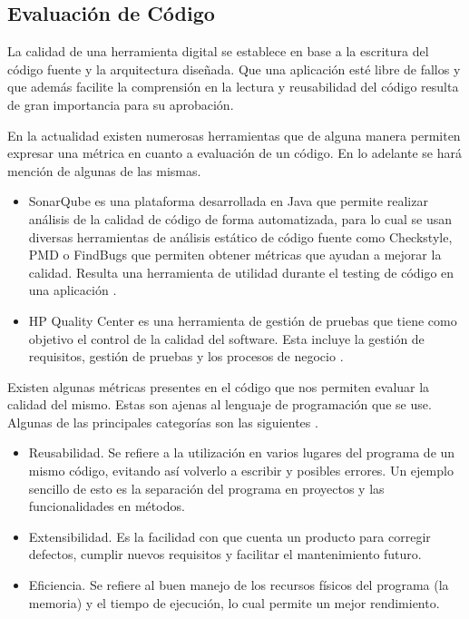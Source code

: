 \documentclass[a4paper,openright,11pt,oneside]{book}
\begin{document}
	\subsection{Evaluación de Código}
	
	La calidad de una herramienta digital se establece en base a la escritura del código fuente y la arquitectura diseñada. Que una aplicación esté libre de fallos y que además facilite la comprensión en la lectura y reusabilidad del código resulta de gran importancia para su aprobación.
	
	En la actualidad existen numerosas herramientas que de alguna manera permiten expresar una métrica en cuanto a evaluación de un código. En lo adelante se hará mención de algunas de las mismas.
	
	\begin{itemize}
		\item SonarQube es una plataforma desarrollada en Java que permite realizar análisis de la calidad de código de forma automatizada, para lo cual se usan diversas herramientas de análisis estático de código fuente como Checkstyle, PMD o FindBugs que permiten obtener métricas que ayudan a mejorar la calidad. Resulta una herramienta de utilidad durante el testing de código en una aplicación \cite{SonarQube}.
		
		\item HP Quality Center es una herramienta de gestión de pruebas que tiene como objetivo el control de la calidad del software. Esta incluye la gestión de requisitos, gestión de pruebas y los procesos de negocio \cite{HPQualityCenter}.
	\end{itemize}
	
	Existen algunas métricas presentes en el código que nos permiten evaluar la calidad del mismo. Estas son ajenas al lenguaje de programación que se use. Algunas de las principales categorías son las siguientes \cite{callejas2017modelos}.
	
	\begin{itemize}
		\item Reusabilidad. Se refiere a la utilización en varios lugares del programa de un mismo código, evitando así volverlo a escribir y posibles errores. Un ejemplo sencillo de esto es la separación del programa en proyectos y las funcionalidades en métodos.
		
		\item Extensibilidad. Es la facilidad con que cuenta un producto para corregir defectos, cumplir nuevos requisitos y facilitar el mantenimiento futuro.
		
		\item Eficiencia. Se refiere al buen manejo de los recursos físicos del programa (la memoria) y el tiempo de ejecución, lo cual permite un mejor rendimiento.
	\end{itemize}
	
\end{document}
